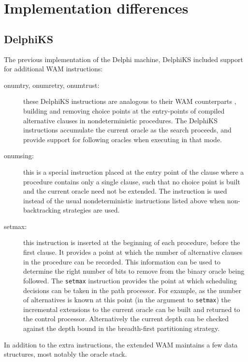 \section{Implementation differences}

\subsection{DelphiKS}

The previous implementation of the Delphi machine, DelphiKS \cite{Kle91,Sar95}
included support for additional WAM \cite{War83} instructions:
\begin{description}
\item[onumtry, onumretry, onumtrust:]{ these DelphiKS instructions are analogous
  to their WAM counterparts \cite{AK90}, building and removing choice points at the
  entry-points of compiled alternative clauses in nondeterministic procedures.  The
  DelphiKS instructions accumulate the current oracle as the search proceeds, and
  provide support for following oracles when executing in that mode.}
\item[onumsing:]{ this is a special instruction placed at the entry point of the
  clause where a procedure contains only a single clause, such that no choice
  point is built and the current oracle need not be extended.  The instruction
  is used instead of the usual nondeterministic instructions listed above when
  non-backtracking strategies are used.}
\item[setmax:]{ this instruction is inserted at the beginning of each procedure,
  before the first clause.  It provides a point at which the number of alternative
  clauses in the procedure can be recorded.  This information can be used to
  determine the right number of bits to remove from the binary oracle being
  followed.  The \texttt{setmax} instruction provides the point at which
  scheduling decisions can be taken in the path processor.  For example, as
  the number of alternatives is known at this point (in the argument to
  \texttt{setmax}) the incremental extensions to the current oracle can be built
  and returned to the control processor.  Alternatively the current depth can
  be checked against the depth bound in the breadth-first partitioning
  strategy.}
\end{description}

In addition to the extra instructions, the extended WAM maintains a
few data structures, most notably the oracle stack.

